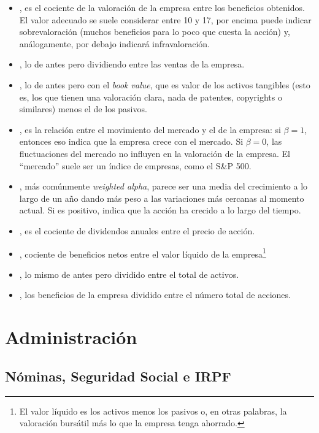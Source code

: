 \documentclass[nochap,palatino,shortheader]{apuntes}
\begin{document}
\begin{itemize}
\item {}, es el cociente de la valoración de la empresa entre los beneficios obtenidos. El valor adecuado se suele considerar entre 10 y 17, por encima puede indicar sobrevaloración (muchos beneficios para lo poco que cuesta la acción) y, análogamente, por debajo indicará infravaloración.
\item {}, lo de antes pero dividiendo entre las ventas de la empresa.
\item {}, lo de antes pero con el \textit{book value}, que es valor de los activos tangibles (esto es, los que tienen una valoración clara, nada de patentes, copyrights o similares) menos el de los pasivos.
\item {}, es la relación entre el movimiento del mercado y el de la empresa: si $β = 1$, entonces eso indica que la empresa crece con el mercado. Si $β=0$, las fluctuaciones del mercado no influyen en la valoración de la empresa. El ``mercado'' suele ser un índice de empresas, como el S\&P 500.
\item {}, más comúnmente \textit{weighted alpha}, parece ser una media del crecimiento a lo largo de un año dando más peso a las variaciones más cercanas al momento actual. Si es positivo, indica que la acción ha crecido a lo largo del tiempo.
\item {}, es el cociente de dividendos anuales entre el precio de acción.
\item {}, cociente de beneficios netos entre el valor líquido de la empresa\footnote{El valor líquido es los activos menos los pasivos o, en otras palabras, la valoración bursátil más lo que la empresa tenga ahorrado.}
\item {}, lo mismo de antes pero dividido entre el total de activos.
\item {}, los beneficios de la empresa dividido entre el número total de acciones.
\end{itemize}

\section{Administración}

\subsection{Nóminas, Seguridad Social e IRPF}
\end{document}
